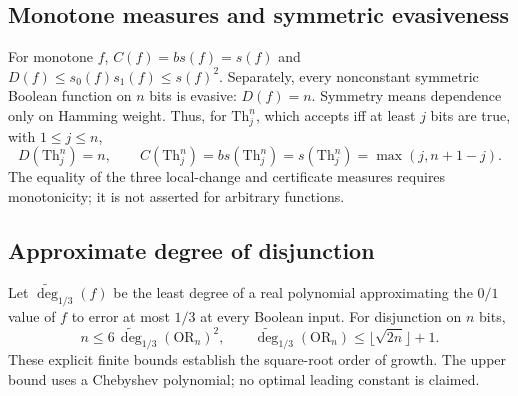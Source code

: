 \begin{result}
\subsection{Monotone measures and symmetric evasiveness}
For monotone $f$, $C(f)=bs(f)=s(f)$ and $D(f)\le s_0(f)s_1(f)\le s(f)^2$.
Separately, every nonconstant symmetric Boolean function on $n$ bits is
evasive: $D(f)=n$. Symmetry means dependence only on Hamming weight.
Thus, for $\mathrm{Th}^n_j$, which accepts iff at least $j$ bits are true,
with $1\le j\le n$,
\[
D(\mathrm{Th}^n_j)=n,\qquad
C(\mathrm{Th}^n_j)=bs(\mathrm{Th}^n_j)=s(\mathrm{Th}^n_j)
 =\max(j,n+1-j).
\]
The equality of the three local-change and certificate measures requires
monotonicity; it is not asserted for arbitrary functions.
\citep{Nisan1991,BuhrmanDeWolf2002}
\end{result}

\begin{result}
\subsection{Approximate degree of disjunction}
Let $\widetilde{\deg}_{1/3}(f)$ be the least degree of a real polynomial
approximating the $0/1$ value of $f$ to error at most $1/3$ at every Boolean input.
For disjunction on $n$ bits,
\[
n\le6\,\widetilde{\deg}_{1/3}(\mathrm{OR}_n)^2,\qquad
\widetilde{\deg}_{1/3}(\mathrm{OR}_n)\le\lfloor\sqrt{2n}\rfloor+1.
\]
These explicit finite bounds establish the square-root order of growth.
The upper bound uses a Chebyshev polynomial; no optimal leading constant is claimed.
\citep{NisanSzegedy1994,BuhrmanDeWolf2002}
\end{result}

